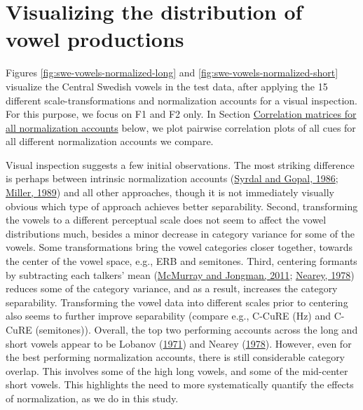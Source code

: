 \documentclass[utf8]{frontiers_suppmat} %
\begin{document}
\hypertarget{sec:normVowelSpace}{%
\section{Visualizing the distribution of vowel productions}\label{sec:normVowelSpace}}

Figures \ref{fig:swe-vowels-normalized-long} and \ref{fig:swe-vowels-normalized-short} visualize the Central Swedish vowels in the test data, after applying the 15 different scale-transformations and normalization accounts for a visual inspection. For this purpose, we focus on F1 and F2 only. In Section \protect\hyperlink{sec:correlation-matrices}{Correlation matrices for all normalization accounts} below, we plot pairwise correlation plots of all cues for all different normalization accounts we compare.

Visual inspection suggests a few initial observations. The most striking difference is perhaps between intrinsic normalization accounts (\protect\hyperlink{ref-Syrdal1986}{Syrdal and Gopal, 1986}; \protect\hyperlink{ref-miller1989c}{Miller, 1989}) and all other approaches, though it is not immediately visually obvious which type of approach achieves better separability. Second, transforming the vowels to a different perceptual scale does not seem to affect the vowel distributions much, besides a minor decrease in category variance for some of the vowels. Some transformations bring the vowel categories closer together, towards the center of the vowel space, e.g., ERB and semitones. Third, centering formants by subtracting each talkers' mean (\protect\hyperlink{ref-mcmurray-jongman2011}{McMurray and Jongman, 2011}; \protect\hyperlink{ref-nearey1978}{Nearey, 1978}) reduces some of the category variance, and as a result, increases the category separability. Transforming the vowel data into different scales prior to centering also seems to further improve separability (compare e.g., C-CuRE (Hz) and C-CuRE (semitones)). Overall, the top two performing accounts across the long and short vowels appear to be Lobanov (\protect\hyperlink{ref-lobanov1971}{1971}) and Nearey (\protect\hyperlink{ref-nearey1978}{1978}). However, even for the best performing normalization accounts, there is still considerable category overlap. This involves some of the high long vowels, and some of the mid-center short vowels. This highlights the need to more systematically quantify the effects of normalization, as we do in this study.
\end{document}

